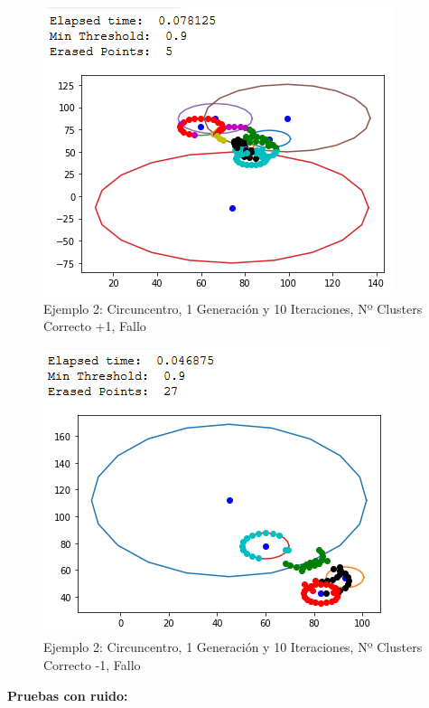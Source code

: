 \documentclass[conference,a4paper]{IEEEtran}
\begin{document}
\begin{figure}[H]
\centering
\includegraphics[scale=0.65]{Experimentacion/Ejemplo2/ej2_c_1_10_mc_wrong}
\caption{Ejemplo 2: Circuncentro, 1 Generación y 10 Iteraciones,  Nº Clusters Correcto +1, Fallo\\}
\end{figure}

\begin{figure}[H]
\centering
\includegraphics[scale=0.65]{Experimentacion/Ejemplo2/ej2_c_1_10_lc_wrong}
\caption{Ejemplo 2: Circuncentro, 1 Generación y 10 Iteraciones,  Nº Clusters Correcto -1, Fallo\\}
\end{figure}

\textbf{Pruebas con ruido:}\\
\end{document}
